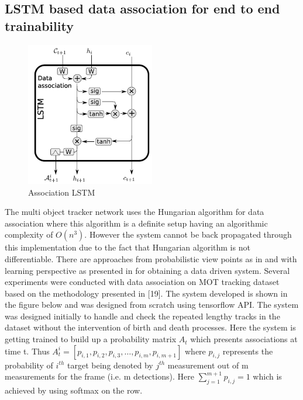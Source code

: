 \subsection{LSTM based data association for end to end trainability}

\begin{figure}[t]
	\centering
	\includegraphics[width=0.5\textwidth]{figs/lstm_associate.png}
	\vspace{-0.3cm}
	\caption{Association LSTM}
	\label{fig:LSTM_network}
	\vspace{0.5cm}
\end{figure}

The multi object tracker network uses the Hungarian algorithm for data association where this algorithm is a definite setup having an algorithmic complexity of $O(n^3)$. However the system cannot be back propagated through this implementation due to the fact that Hungarian algorithm is not differentiable. There are approaches from probabilistic view points as in \cite{russel}  and with learning perspective as presented in \cite{DeepSiam:multitarget} for obtaining a data driven system. Several experiments were conducted with data association on MOT tracking dataset based on the methodology presented in [19]. The system developed is shown in the figure below and was designed from scratch using tensorflow API. The system was designed initially to handle and check the repeated lengthy tracks in the dataset without the intervention of birth and death processes. Here the system is getting trained to build up a probability matrix $A_t$ which presents associations at time t. Thus $A_t^i=[p_{i,1},p_{i,2},p_{i,3},\ldots,p_{i,m},p_{i,m+1}]$ where  $p_{i,j}$ represents the probability of $i^{th}$  target being denoted by $j^{th}$ measurement out of m measurements for the frame (i.e. m detections).
Here 
$\sum_{j=1}^{m+1}p_{i,j}=1$ which is achieved by using softmax on the row.

